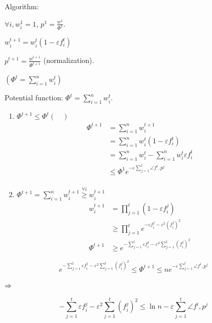 \bigskip

Algorithm:

$\forall i, w_i^1 = 1$, $p^1 = \frac{w^1}{\Phi^1}$.

$w_i^{t+1} = w_i^t\left( 1-\varepsilon f_i^t\right)$

$p^{t+1} = \frac{w^{t+1}}{\Phi^{t+1}}$ (normalization).

$\left( \Phi^t = \sum\limits_{i=1}^n w_i^t \right)$

\bigskip

Potential function: $\Phi^t= \sum\limits_{i=1}^n w_i^t$.

\begin{enumerate}
    \item $\Phi^{t+1} \leqslant \Phi^t \left( \quad \right)$
        \[
            \begin{aligned}
                \Phi^{t+1} &= \sum\limits_{i=1}^nw_i^{t+1}\\
                &= \sum\limits_{i=1}^nw_i^t\left( 1-\varepsilon f_i^t \right)\\
                &= \sum\limits_{i=1}^nw_i^t- \sum\limits_{i=1}^nw_i^t \varepsilon f_i^t\\
                &\leqslant \Phi^1 e^{-\varepsilon \sum\limits_{j=1}^t \angle{f^i, p^j}}\\
            \end{aligned}       
        \]
    \item $\Phi^{t+1} = \sum\limits_{i=1}^n w_i^{t+1} \overset{\forall i}{\geqslant} w_i^{t+1}$
        \[
            \begin{aligned}
                w_i^{t+1} &= \prod\limits_{j=1}^t \left( 1-\varepsilon f_i^j\right)\\
                &\geqslant \prod\limits_{j=1}^t e^{-\varepsilon f_i^j - \varepsilon ^2(f_i^j)^2}\\
                \Phi^{t+1} &\geqslant e^{-\sum\limits_{j=1}^t \varepsilon f_i^j - \varepsilon^2 \sum\limits_{j=1}^t (f_i^j)^2}
            \end{aligned}
        \]
\end{enumerate}

\[
    e^{-\sum\limits_{j=1}^t \varepsilon f_i^j - \varepsilon^2 \sum\limits_{j=1}^t (f_i^j)^2}\leqslant \Phi^{t+1}\leqslant n e^{-\varepsilon \sum\limits_{j=1}^t \angle{f^i, p^j}}
\]

$\Rightarrow$

\[
    -\sum\limits_{j=1}^t \varepsilon f_i^j - \varepsilon^2 \sum\limits_{j=1}^t (f_i^j)^2 \leqslant \ln n -\varepsilon \sum\limits_{j=1}^t \angle{f^i, p^j}
\]

